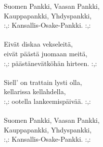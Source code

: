 
            Suomen Pankki, Vaasan Pankki, \\
            Kauppapankki, Yhdyspankki, \\
            :,: Kansallis-Osake-Pankki. :,: \\
\hspace{10mm} \\
            Eivät diskaa vekseleitä, \\
            eivät päästä juomaan meitä, \\
            :,: päästänevätköhän hirteen. :,: \\
\hspace{10mm} \\
            Siell’ on trattain lysti olla, \\
            kellarissa kellahdella, \\
            :,: ootella lankeemispäivää. :,: \\
\hspace{10mm} \\
            Suomen Pankki, Vaasan Pankki, \\
            Kauppapankki, Yhdyspankki, \\
            :,: Kansallis-Osake-Pankki. :,: \\
